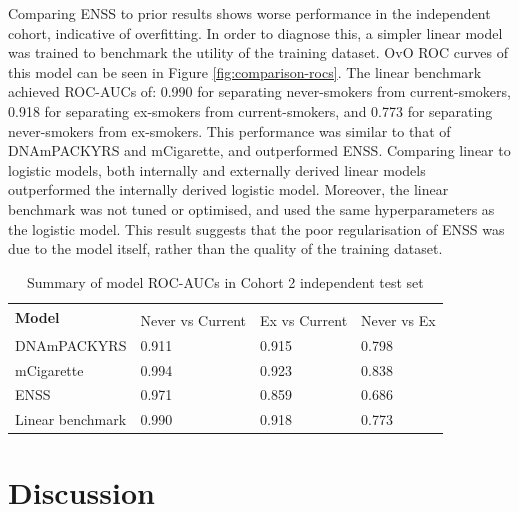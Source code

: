 \documentclass{article} %
\begin{document}
Comparing ENSS to prior results shows worse performance in the independent cohort, indicative of overfitting. In order to diagnose this, a simpler linear model was trained to benchmark the utility of the training dataset. OvO ROC curves of this model can be seen in Figure \ref{fig:comparison-rocs}. The linear benchmark achieved ROC-AUCs of: 0.990 for separating never-smokers from current-smokers, 0.918 for separating ex-smokers from current-smokers, and 0.773 for separating never-smokers from ex-smokers. This performance was similar to that of DNAmPACKYRS and mCigarette, and outperformed ENSS. Comparing linear to logistic models, both internally and externally derived linear models outperformed the internally derived logistic model. Moreover, the linear benchmark was not tuned or optimised, and used the same hyperparameters as the logistic model. This result suggests that the poor regularisation of ENSS was due to the model itself, rather than the quality of the training dataset.

\begin{table}[p]
    \caption{Summary of model ROC-AUCs in Cohort 2 independent test set} \label{table:auc-comparison}
    \begin{tabularx}{\textwidth}{X >{\centering\arraybackslash}X >{\centering\arraybackslash}X >{\centering\arraybackslash}X}
        \toprule
        \multirow{2}{*}{\textbf{Model}} & \multicolumn{3}{c}{\textbf{AUC}}                               \\
        \cmidrule(lr){2-4}
                                        & Never vs Current                 & Ex vs Current & Never vs Ex \\
        \midrule
        DNAmPACKYRS                     & \num{0.911}                      & \num{0.915}   & \num{0.798} \\
        \addlinespace
        mCigarette                      & \num{0.994}                      & \num{0.923}   & \num{0.838} \\
        \addlinespace
        ENSS                            & \num{0.971}                      & \num{0.859}   & \num{0.686} \\
        \addlinespace
        Linear benchmark                & \num{0.990}                      & \num{0.918}   & \num{0.773} \\
        \bottomrule
    \end{tabularx}
\end{table}

\newpage
\section{Discussion}
\end{document}

